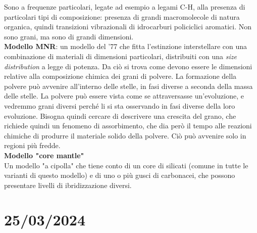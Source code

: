 Sono a frequenze particolari, legate ad esempio a legami C-H, alla presenza di particolari tipi di composizione: presenza di grandi macromolecole di natura organica, quindi transizioni vibrazionali di idrocarburi policiclici aromatici. Non sono grani, ma sono di grandi dimensioni.\\
\textbf{Modello MNR}: un modello del '77 che fitta l'estinzione interstellare con una combinazione di materiali di dimensioni particolari, distribuiti con una \textit{size distribution} a legge di potenza.
Da ciò si trova come devono essere le dimensioni relative alla composizione chimica dei grani di polvere.
La formazione della polvere può avvenire all'interno delle stelle, in fasi diverse a seconda della massa delle stelle.
La polvere può essere vista come se attraversasse un'evoluzione, e vedremmo grani diversi perché li si sta osservando in fasi diverse della loro evoluzione.
Bisogna quindi cercare di descrivere una crescita del grano, che richiede quindi un fenomeno di assorbimento, che dia però il tempo alle reazioni chimiche di produrre il materiale solido della polvere. Ciò può avvenire solo in regioni più fredde.\\
\textbf{Modello "core mantle"}\\
Un modello "a cipolla" che tiene conto di un core di silicati (comune in tutte le varianti di questo modello) e di uno o più gusci di carbonacei, che possono presentare livelli di ibridizzazione diversi.


\section{25/03/2024}
